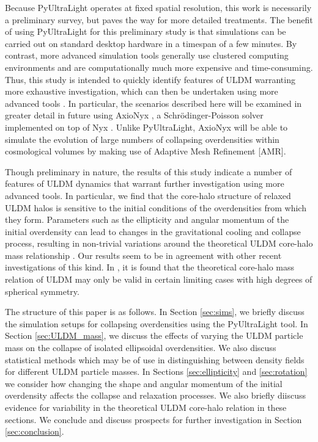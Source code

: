 \documentclass[a4paper,11pt]{article}
\begin{document}
Because {\sc PyUltraLight} operates at fixed spatial resolution, this work is necessarily a preliminary survey, but paves the way for more detailed treatments. The benefit of using {\sc PyUltraLight} for this preliminary study is that simulations can be carried out on standard desktop hardware in a timespan of a few minutes. By contrast, more advanced simulation tools generally use clustered computing environments and are computationally much more expensive and time-consuming. Thus, this study is intended to quickly identify features of ULDM warranting more exhaustive investigation, which can then be undertaken using more advanced tools \cite{Mocz:2019emo, Niemeyer:2019aqm, Veltmaat:2019hou}. In particular, the scenarios described here will be examined in greater detail in future using {\sc AxioNyx} \cite{Schwabe:2020eac}, a Schr\"{o}dinger-Poisson solver implemented on top of {\sc Nyx} \cite{Almgren:2013sz}. Unlike {\sc PyUltraLight}, {\sc AxioNyx} will be able to simulate the evolution of large numbers of collapsing overdensities within cosmological volumes by making use of Adaptive Mesh Refinement [AMR].

Though preliminary in nature, the results of this study indicate a number of features of ULDM dynamics that warrant further investigation using more advanced tools. In particular, we find that the core-halo structure of relaxed ULDM halos is sensitive to the initial conditions of the overdensities from which they form. Parameters such as the ellipticity and angular momentum of the initial overdensity can lead to changes in the gravitational cooling and collapse process, resulting in non-trivial variations around the theoretical ULDM core-halo mass relationship \cite{Schive:2014hza}. Our results seem to be in agreement with other recent investigations of this kind. In \cite{Nori:2020jzx}, it is found that the theoretical core-halo mass relation of ULDM may only be valid in certain limiting cases with high degrees of spherical symmetry. 

The structure of this paper is as follows. In Section \ref{sec:sims}, we briefly discuss the simulation setups for collapsing overdensities using the {\sc PyUltraLight} tool. In Section \ref{sec:ULDM_mass}, we discuss the effects of varying the ULDM particle mass on the collapse of isolated ellipsoidal overdensities. We also discuss statistical methods which may be of use in distinguishing between density fields for different ULDM particle masses. In Sections \ref{sec:ellipticity} and \ref{sec:rotation} we consider how changing the shape and angular momentum of the initial overdensity affects the collapse and relaxation processes. We also briefly diiscuss evidence for variability in the theoretical ULDM core-halo relation in these sections. We conclude and discuss prospects for further investigation in Section \ref{sec:conclusion}.
\end{document}
